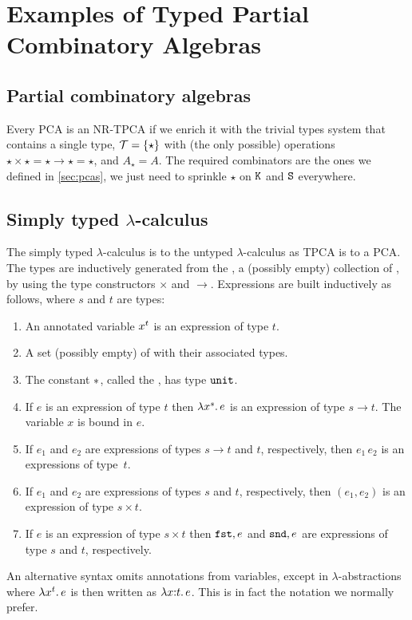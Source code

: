 \section{Examples of Typed Partial Combinatory Algebras}
\label{sec:examples-tpcas}

\subsection{Partial combinatory algebras}

Every PCA is an NR-TPCA if we enrich it with the trivial types system
that contains a single type, $\mathcal{T} = \{\star\}$ with (the
only possible) operations $\star \times \star = \star \to \star =
\star$, and $A_\star = A$. The required combinators are the ones we
defined in \cref{sec:pcas}, we just need to sprinkle $\star$ on
$\mathtt{K}$ and $\mathtt{S}$ everywhere.


\subsection[\texorpdfstring%
{Simply typed $\lambda$-calculus}%
{Simply typed lambda-calculus}%
]{Simply typed $\lambda$-calculus}
\label{sec:typed-lambda-calculus}

The simply typed $\lambda$-calculus is to the untyped $\lambda$-calculus as
TPCA is to a PCA. The types are inductively generated from the
, a (possibly empty) collection of
, by using the type constructors $\times$ and
$\to$. Expressions are built inductively as follows, where $s$ and $t$
are types:
%
\begin{enumerate}
\item An annotated variable $x^{t}$ is an expression of type
  $t$.
\item A set (possibly empty) of  with their associated types.
\item The constant ${*}$, called the , has type
  $\mathtt{unit}$.
\item If $e$ is an expression of type $t$ then
  $\lambda x^{s} .\,e$ is an expression of type $s \to t$. The
  variable $x$ is bound in $e$.
\item If $e_1$ and $e_2$ are expressions of types $s \to t$ and
  $t$, respectively, then $e_1\, e_2$ is an expressions of type~$t$.
\item If $e_1$ and $e_2$ are expressions of types $s$ and $t$,
  respectively, then $(e_1, e_2)$ is an expression of type $s \times
  t$.
\item If $e$ is an expression of type $s \times t$ then $\mathtt{fst},e$ and
  $\mathtt{snd},e$ are expressions of type $s$ and $t$, respectively.
\end{enumerate}
%
An alternative syntax omits annotations from variables, except in
$\lambda$-abstractions where $\lambda x^{t} .\,e$ is then written
as $\lambda x {:} t .\,e$. This is in fact the notation we normally prefer.

